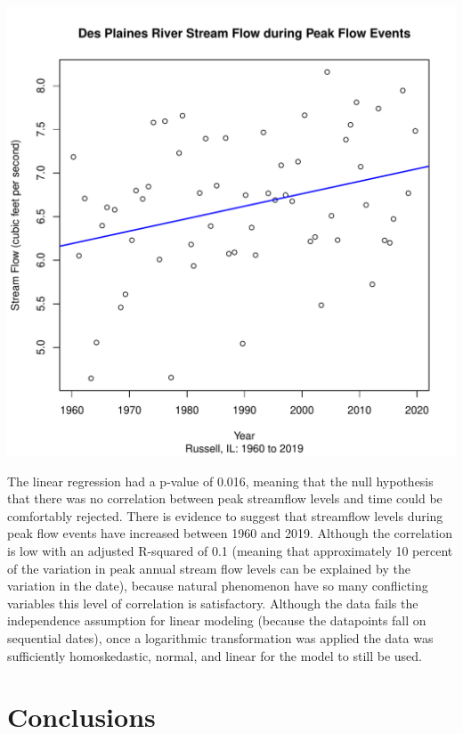 \documentclass{article}\usepackage[]{graphicx}\usepackage[]{color}
\makeatletter
\def\maxwidth{ %
  \ifdim\Gin@nat@width>\linewidth
    \linewidth
  \else
    \Gin@nat@width
  \fi
}
\newenvironment{knitrout}{}{} %
\makeatother
\begin{document}
\begin{knitrout}
\color{fgcolor}
\includegraphics[width=\maxwidth]{figure/unnamed-chunk-1-1} 

\end{knitrout}

The linear regression had a p-value of 0.016, meaning that the null hypothesis that there was no correlation between peak streamflow levels and time could be comfortably rejected.  There is evidence to suggest that streamflow levels during peak flow events have increased between 1960 and 2019.  Although the correlation is low with an adjusted R-squared of 0.1 (meaning that approximately 10 percent of the variation in peak annual stream flow levels can be explained by the variation in the date), because natural phenomenon have so many conflicting variables this level of correlation is satisfactory.  Although the data fails the independence assumption for linear modeling (because the datapoints fall on sequential dates), once a logarithmic transformation was applied the data was sufficiently homoskedastic, normal, and linear for the model to still be used.  

\section*{Conclusions}
\end{document}
